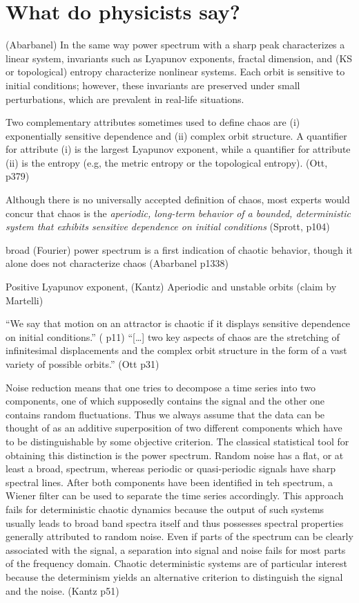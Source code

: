 \documentclass[11pt]{book}
\begin{document}
\chapter{What do physicists say?}
(Abarbanel)
In the same way power spectrum with a sharp peak characterizes a linear system,
invariants such as Lyapunov exponents, fractal dimension, and (KS or topological) entropy
characterize nonlinear systems.
Each orbit is sensitive to initial conditions; however, these invariants
are preserved under small perturbations, which are prevalent in real-life situations.

Two complementary attributes sometimes used to define chaos are
(i) exponentially sensitive dependence and
(ii) complex orbit structure.
A quantifier for attribute (i) is the largest Lyapunov exponent, while
a quantifier for attribute (ii) is the entropy (e.g, the metric entropy
or the topological entropy).
(Ott, p379)

Although there is no universally accepted definition of chaos,
most experts would concur that chaos is the {\it aperiodic,
  long-term behavior of a bounded, deterministic system
that exhibits sensitive dependence on initial conditions} (Sprott, p104)

broad (Fourier) power spectrum is a first indication of chaotic behavior,
though it alone does not characterize chaos (Abarbanel p1338)

Positive Lyapunov exponent, (Kantz)
Aperiodic and unstable orbits (claim by Martelli)

``We say that motion on an attractor is chaotic if
it displays sensitive dependence on initial conditions.'' (\cite{ott-sauer} p11)
``[\ldots] two key aspects of chaos are the stretching of infinitesimal displacements
and the complex orbit structure in the form of a vast variety of possible orbits.'' (Ott p31)

Noise reduction means that one tries to decompose a time series into
two components, one of which supposedly contains the signal and the other
one contains random fluctuations. Thus we always assume that the data
can be thought of as an additive superposition of two different components which
have to be distinguishable by some objective criterion. The classical statistical
tool for obtaining this distinction is the power spectrum. Random noise has
a flat, or at least a broad, spectrum, whereas periodic or quasi-periodic
signals have sharp spectral lines. After both components have been identified
in teh spectrum, a Wiener filter can be used to separate the time series
accordingly.
This approach fails for deterministic chaotic dynamics because the output
of such systems usually leads to broad band spectra itself and thus possesses
spectral properties generally attributed to random noise. Even if parts of the
spectrum can be clearly associated with the signal, a separation into signal and
noise fails for most parts of the frequency domain. Chaotic deterministic systems
are of particular interest because the determinism yields an alternative criterion
to distinguish the signal and the noise. (Kantz p51)



\end{document}
